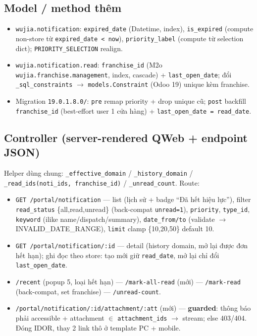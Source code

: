 \subsection{Model / method thêm}

\begin{itemize}
\item \texttt{wujia.notification}: \texttt{expired\_date} (Datetime, index), \texttt{is\_expired}
      (compute non-store từ \texttt{expired\_date < now}), \texttt{priority\_label} (compute từ
      selection dict); \texttt{PRIORITY\_SELECTION} realign.
\item \texttt{wujia.notification.read}: \texttt{franchise\_id} (M2o
      \texttt{wujia.franchise.management}, index, cascade) + \texttt{last\_open\_date}; đổi
      \texttt{\_sql\_constraints} $\rightarrow$ \texttt{models.Constraint} (Odoo 19) unique kèm
      franchise.
\item Migration \texttt{19.0.1.8.0/}: \texttt{pre} remap priority + drop unique cũ; \texttt{post}
      backfill \texttt{franchise\_id} (best-effort user 1 cửa hàng) + \texttt{last\_open\_date =
      read\_date}.
\end{itemize}

\subsection{Controller (server-rendered QWeb + endpoint JSON)}

Helper dùng chung: \texttt{\_effective\_domain} / \texttt{\_history\_domain} /
\texttt{\_read\_ids(noti\_ids, franchise\_id)} / \texttt{\_unread\_count}. Route:

\begin{itemize}
\item \texttt{GET /portal/notification} --- list (lịch sử + badge ``Đã hết hiệu lực''), filter
      \texttt{read\_status} \{all,read,unread\} (back-compat \texttt{unread=1}), \texttt{priority},
      \texttt{type\_id}, \texttt{keyword} (ilike name/dispatch/summary), \texttt{date\_from/to}
      (validate $\rightarrow$ INVALID\_DATE\_RANGE), \texttt{limit} clamp \{10,20,50\} default 10.
\item \texttt{GET /portal/notification/:id} --- detail (history domain, mở lại được đơn hết hạn);
      ghi đọc theo store: tạo mới giữ \texttt{read\_date}, mở lại chỉ đổi \texttt{last\_open\_date}.
\item \texttt{/recent} (popup 5, loại hết hạn) --- \texttt{/mark-all-read} (mới) ---
      \texttt{/mark-read} (back-compat, set franchise) --- \texttt{/unread-count}.
\item \texttt{/portal/notification/:id/attachment/:att} (mới) --- \textbf{guarded}: thông báo phải
      accessible + attachment $\in$ \texttt{attachment\_ids} $\rightarrow$ stream; else 403/404.
      Đóng IDOR, thay 2 link thô ở template PC + mobile.
\end{itemize}

